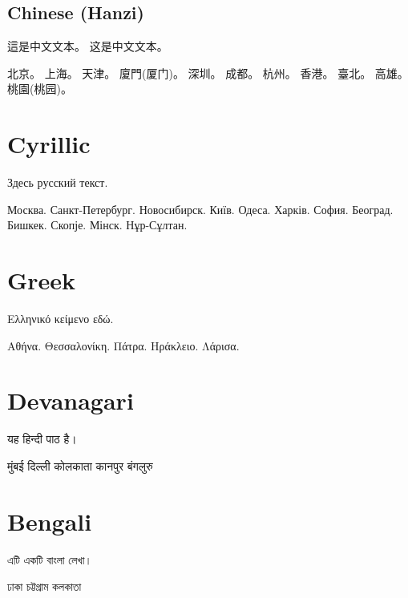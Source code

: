 \documentclass[a4paper]{article}
\begin{document}
\subsection{Chinese (Hanzi)}
\begin{chinese}
這是中文文本。
这是中文文本。

北京。
上海。
天津。
廈門(厦门)。
深圳。
成都。
杭州。
香港。
臺北。
高雄。
桃園(桃园)。
\end{chinese}

\section{Cyrillic}
\begin{russian}
Здесь русский текст.

Москва.
Санкт-Петербург.
Новосибирск.
Київ.
Одеса.
Харків.
София.
Београд.
Бишкек.
Скопје.
Мінск.
Нұр-Сұлтан.
\end{russian}

\section{Greek}
\begin{greek}
Ελληνικό κείμενο εδώ.

Αθήνα.
Θεσσαλονίκη.
Πάτρα.
Ηράκλειο.
Λάρισα.
\end{greek}

\section{Devanagari}
\begin{hindi}
यह हिन्दी पाठ है।

मुंबई %
दिल्ली %
कोलकाता %
कानपुर %
बंगलुरु %
\end{hindi}

\section{Bengali}
\begin{bengali}
এটি একটি বাংলা লেখা।

ঢাকা %
চট্টগ্রাম %
কলকাতা %
\end{bengali}
\end{document}
